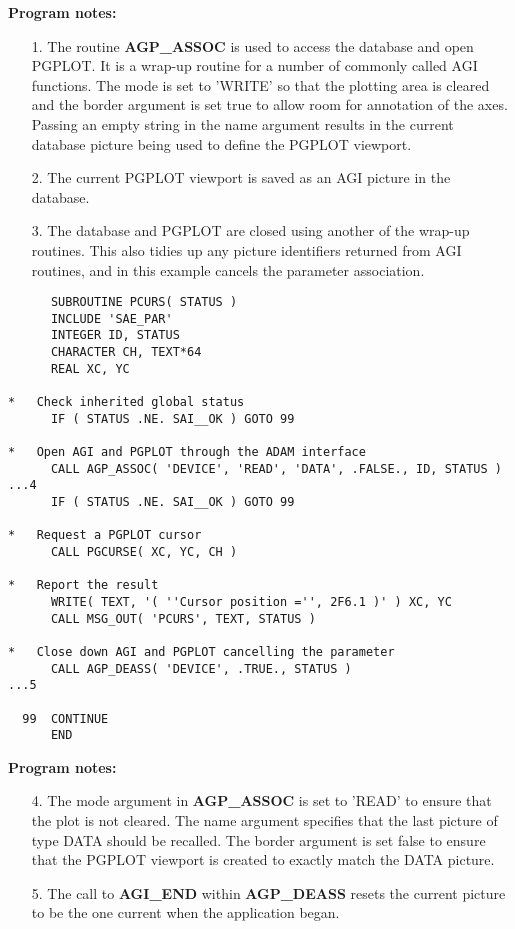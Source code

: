 {\bf Program notes:}
\begin{enumerate}
\item[1.] The routine {\bf AGP\_ASSOC} is used to access the database and
open PGPLOT. It is a wrap-up routine for a number of commonly called AGI
functions. The mode is set to 'WRITE' so that the plotting area is cleared
and the border argument is set true to allow room for annotation of the
axes. Passing an empty string in the name argument results in the current
database picture being used to define the PGPLOT viewport.
\item[2.] The current PGPLOT viewport is saved as an AGI picture in the
database.
\item[3.] The database and PGPLOT are closed using another of the wrap-up
routines. This also tidies up any picture identifiers returned from AGI
routines, and in this example cancels the parameter association.
\end{enumerate}

\begin{verbatim}
      SUBROUTINE PCURS( STATUS )
      INCLUDE 'SAE_PAR'
      INTEGER ID, STATUS
      CHARACTER CH, TEXT*64
      REAL XC, YC

*   Check inherited global status
      IF ( STATUS .NE. SAI__OK ) GOTO 99

*   Open AGI and PGPLOT through the ADAM interface
      CALL AGP_ASSOC( 'DEVICE', 'READ', 'DATA', .FALSE., ID, STATUS )   ...4
      IF ( STATUS .NE. SAI__OK ) GOTO 99

*   Request a PGPLOT cursor
      CALL PGCURSE( XC, YC, CH )

*   Report the result
      WRITE( TEXT, '( ''Cursor position ='', 2F6.1 )' ) XC, YC
      CALL MSG_OUT( 'PCURS', TEXT, STATUS )

*   Close down AGI and PGPLOT cancelling the parameter
      CALL AGP_DEASS( 'DEVICE', .TRUE., STATUS )                        ...5

  99  CONTINUE
      END
\end{verbatim}

\newpage %
{\bf Program notes:}
\begin{enumerate}
\item[4.] The mode argument in {\bf AGP\_ASSOC} is set to 'READ' to ensure
that the plot is not cleared. The name argument specifies that the last
picture of type DATA should be recalled.
The border argument is set false to ensure that the PGPLOT viewport is
created to exactly match the DATA picture.
\item[5.] The call to {\bf AGI\_END} within {\bf AGP\_DEASS} resets the
current picture to be the one current when the application began.
\end{enumerate}

